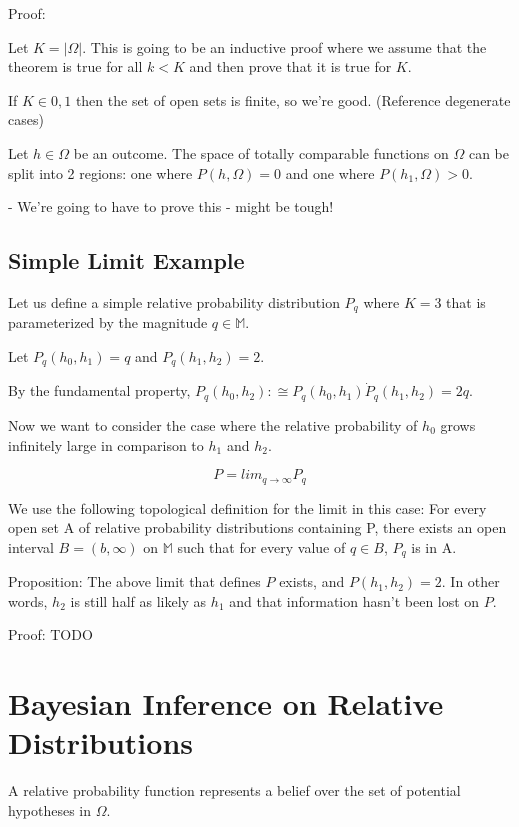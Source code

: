 \documentclass[twoside]{article}
\begin{document}
Proof:

Let \(K = |\Omega|\). This is going to be an inductive proof where we assume that the theorem is true for all \(k < K\) and then prove that it is true for \(K\).

If \(K \in {0, 1}\) then the set of open sets is finite, so we're good. (Reference degenerate cases)

Let \(h \in \Omega\) be an outcome. The space of totally comparable functions on \(\Omega\) can be split into 2 regions: one where \(P(h, \Omega) = 0\) and one where \(P(h_1, \Omega) > 0\).

- We're going to have to prove this - might be tough!

\subsection{Simple Limit Example}

Let us define a simple relative probability distribution \(P_q\) where \(K = 3\) that is parameterized by the magnitude \(q \in \mathbb{M}\).

Let \(P_q(h_0, h_1) = q\) and \(P_q(h_1, h_2) = 2\).

By the fundamental property, \(P_q(h_0, h_2) :\cong P_q(h_0, h_1) \dot P_q(h_1, h_2) = 2q\).

Now we want to consider the case where the relative probability of \(h_0\) grows infinitely large in comparison to \(h_1\) and \(h_2\).

\[P = lim_{q \rightarrow \infty} P_q\]

We use the following topological definition for the limit in this case: For every open set A of relative probability distributions containing P, there exists an open interval \(B=(b, \infty)\) on \(\mathbb{M}\) such that for every value of \(q \in B\), \(P_q\) is in A.

Proposition: The above limit that defines \(P\) exists, and \(P(h_1, h_2) = 2\). In other words, \(h_2\) is still half as likely as \(h_1\) and that information hasn't been lost on \(P\).

Proof: TODO

\section{Bayesian Inference on Relative Distributions}

A relative probability function represents a belief over the set of potential hypotheses in \(\Omega\).
\end{document}
